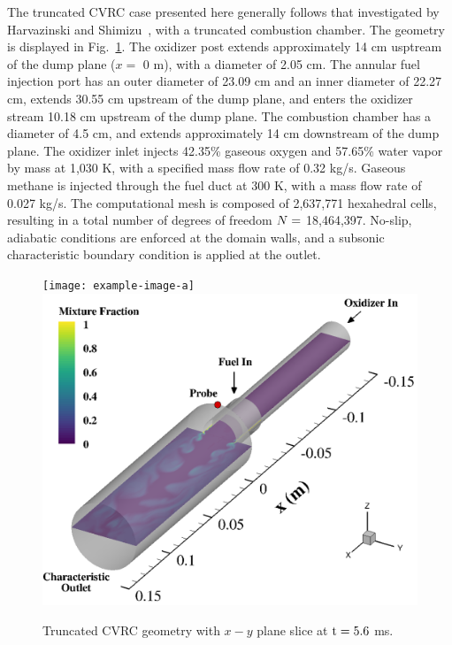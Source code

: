 The truncated CVRC case presented here generally follows that investigated by Harvazinski and Shimizu~\cite{HarvazinskiCVRCflamelet}, with a truncated combustion chamber. The geometry is displayed in Fig.~\ref{fig:cvrcGeom}. The oxidizer post extends approximately 14 cm usptream of the dump plane ($x = $ 0 m), with a diameter of 2.05 cm. The annular fuel injection port has an outer diameter of 23.09 cm and an inner diameter of 22.27 cm, extends 30.55 cm upstream of the dump plane, and enters the oxidizer stream 10.18 cm upstream of the dump plane. The combustion chamber has a diameter of 4.5 cm, and extends approximately 14 cm downstream of the dump plane. The oxidizer inlet injects 42.35\% gaseous oxygen and 57.65\% water vapor by mass at 1,030 K, with a specified mass flow rate of 0.32 kg/s. Gaseous methane is injected through the fuel duct at 300 K, with a mass flow rate of 0.027 kg/s. The computational mesh is composed of 2,637,771 hexahedral cells, resulting in a total number of degrees of freedom $N =$ 18,464,397. No-slip, adiabatic conditions are enforced at the domain walls, and a subsonic characteristic boundary condition is applied at the outlet.

\begin{figure}
	\centering
	\ifdefined\DRAFT
		\texttt{[image: example-image-a]}
	\else
    	\includegraphics[width=0.8\linewidth]{Chapters/CavityAndCVRC/Images/cvrc/geom.png}
	\fi
    \caption{\label{fig:cvrcGeom}
	Truncated CVRC geometry with $x-y$ plane slice at $\text{t} = 5.6$ ms.}
\end{figure}

